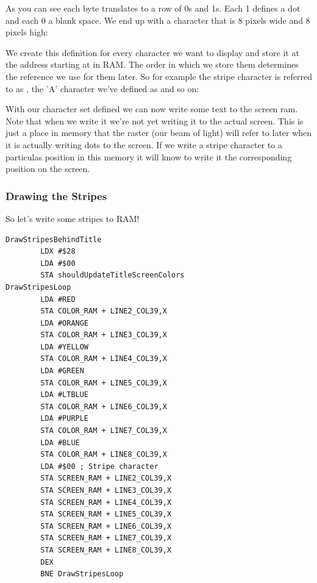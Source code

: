 As you can see each byte translates to a row of 0s and 1s. Each 1 defines a dot and each 0 a blank space. We end up
with a character that is 8 pixels wide and 8 pixels high:



We create this definition for every character we want to display and store it at the address starting at 
in RAM. The order in which we store them determines the reference we use for them later. So for example the stripe
character is referred to as , the 'A' character we've defined as  and so on:



With our character set defined we can now write some text to the screen ram. Note that when we write it 
we're not yet writing it to the actual screen. This is just a place in memory that the raster (our beam of light)
will refer to later when it is actually writing dots to the screen. If we write a stripe character to a particulas position
in this  memory it will know to write it the corresponding position on the screen.

\subsubsection{Drawing the Stripes}
So let's write some stripes to RAM!

\begin{lstlisting}[caption=The 'stripe' character.]
DrawStripesBehindTitle
        LDX #$28
        LDA #$00
        STA shouldUpdateTitleScreenColors
DrawStripesLoop   
        LDA #RED
        STA COLOR_RAM + LINE2_COL39,X
        LDA #ORANGE
        STA COLOR_RAM + LINE3_COL39,X
        LDA #YELLOW
        STA COLOR_RAM + LINE4_COL39,X
        LDA #GREEN
        STA COLOR_RAM + LINE5_COL39,X
        LDA #LTBLUE
        STA COLOR_RAM + LINE6_COL39,X
        LDA #PURPLE
        STA COLOR_RAM + LINE7_COL39,X
        LDA #BLUE
        STA COLOR_RAM + LINE8_COL39,X
        LDA #$00 ; Stripe character
        STA SCREEN_RAM + LINE2_COL39,X
        STA SCREEN_RAM + LINE3_COL39,X
        STA SCREEN_RAM + LINE4_COL39,X
        STA SCREEN_RAM + LINE5_COL39,X
        STA SCREEN_RAM + LINE6_COL39,X
        STA SCREEN_RAM + LINE7_COL39,X
        STA SCREEN_RAM + LINE8_COL39,X
        DEX
        BNE DrawStripesLoop

\end{lstlisting}


